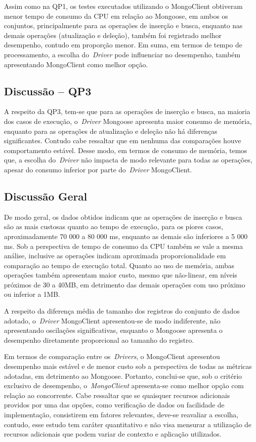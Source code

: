 \documentclass[12pt]{article}
\begin{document}
Assim como na QP1, os testes executados utilizando o MongoClient obtiveram menor tempo de consumo da CPU em relação ao Mongoose, em ambos os conjuntos, principalmente para as operações de inserção e busca, enquanto nas demais operações (atualização e deleção), também foi registrado melhor desempenho, contudo em proporção menor.
Em suma, em termos de tempo de processamento, a escolha do~\emph{Driver} pode influenciar no desempenho, também apresentando MongoClient como melhor opção.

\subsection{Discussão -- QP3}
\label{q3}

A respeito da QP3, tem-se que para as operações de inserção e busca, na maioria dos casos de execução, o~\emph{Driver} Mongoose apresenta maior consumo de memória, enquanto para as operações de atualização e deleção não há diferenças significantes.
Contudo cabe ressaltar que em nenhuma das comparações houve comportamento estável.
Desse modo, em termos de consumo de memória, temos que, a escolha do~\emph{Driver} não impacta de modo relevante para todas as operações, apesar do consumo inferior por parte do~\emph{Driver} MongoClient.

\subsection{Discussão Geral}
\label{qgeral}

De modo geral, os dados obtidos indicam que as operações de inserção e busca são as mais custosas quanto ao tempo de execução, para os piores casos, aproximadamente 70 000 a 80 000 ms, enquanto as demais são inferiores a 5 000 ms.
Sob a perspectiva de tempo de consumo da CPU também se vale a mesma análise, inclusive as operações indicam aproximada proporcionalidade em comparação ao tempo de execução total.
Quanto ao uso de memória, ambas operações também apresentam maior custo, mesmo que não-linear, em níveis próximos de 30 a 40MB, em detrimento das demais operações com uso próximo ou inferior a 1MB.

A respeito da diferença média de tamanho dos registros do conjunto de dados adotado, o~\emph{Driver} MongoClient apresentou-se de modo indiferente, não apresentando oscilações significativas, enquanto o Mongoose apresenta o desempenho diretamente proporcional ao tamanho do registro.

Em termos de comparação entre os~\emph{Drivers}, o MongoClient apresentou desempenho mais estável e de menor custo sob a perspectiva de todas as métricas adotadas, em detrimento ao Mongoose. Portanto, conclui-se que, sob o critério exclusivo de desempenho, o~\emph{MongoClient} apresenta-se como melhor opção com relação ao concorrente. Cabe ressaltar que se quaisquer recursos adicionais providos por uma das opções, como verificação de dados ou facilidade de implementação, consistirem em fatores relevantes, deve-se reavaliar a escolha, contudo, esse estudo tem caráter quantitativo e não visa mensurar a utilização de recursos adicionais que podem variar de contexto e aplicação utilizados.
\end{document}
